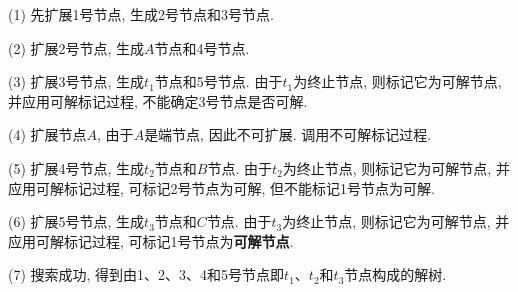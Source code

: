 (1) 先扩展1号节点, 生成2号节点和3号节点.

(2) 扩展2号节点, 生成$A$节点和4号节点.

(3) 扩展3号节点, 生成$t_1$节点和5号节点. 由于$t_1$为终止节点, 则标记它为可解节点, 并应用可解标记过程, 不能确定3号节点是否可解.

(4) 扩展节点$A$, 由于$A$是端节点, 因此不可扩展. 调用不可解标记过程.

(5) 扩展4号节点, 生成$t_2$节点和$B$节点. 由于$t_2$为终止节点, 则标记它为可解节点, 并应用可解标记过程, 可标记2号节点为可解, 但不能标记1号节点为可解.

(6) 扩展5号节点, 生成$t_3$节点和$C$节点. 由于$t_3$为终止节点, 则标记它为可解节点, 并应用可解标记过程, 可标记1号节点为\textbf{可解节点}.

(7) 搜索成功, 得到由1、2、3、4和5号节点即$t_1$、$t_2$和$t_3$节点构成的解树.
